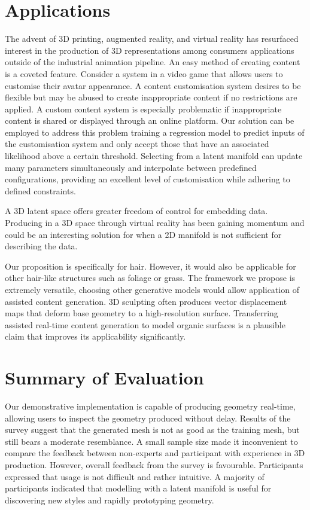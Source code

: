 \documentclass[ %
author={Dillon Keith Diep},
supervisor={Dr. Carl Henrik Ek},
degree={MEng},
title={ART-CG Hair:},
subtitle={Assisted Real-time Content Generation of Stylised Virtual Hair},
type={Research},
year={2017} ]{dissertation}
\begin{document}
\section{Applications}
\label{evaluation:application}
The advent of 3D printing, augmented reality, and virtual reality has resurfaced interest in the production of 3D representations among consumers applications outside of the industrial animation pipeline. An easy method of creating content is a coveted feature. Consider a system in a video game that allows users to customise their avatar appearance. A content customisation system desires to be flexible but may be abused to create inappropriate content if no restrictions are applied. A custom content system is especially problematic if inappropriate content is shared or displayed through an online platform. Our solution can be employed to address this problem training a regression model to predict inputs of the customisation system and only accept those that have an associated likelihood above a certain threshold. Selecting from a latent manifold can update many parameters simultaneously and interpolate between predefined configurations, providing an excellent level of customisation while adhering to defined constraints.

A 3D latent space offers greater freedom of control for embedding data. Producing in a 3D space through virtual reality has been gaining momentum and could be an interesting solution for when a 2D manifold is not sufficient for describing the data.

Our proposition is specifically for hair. However, it would also be applicable for other hair-like structures such as foliage or grass. The framework we propose is extremely versatile, choosing other generative models would allow application of assisted content generation. 3D sculpting often produces vector displacement maps that deform base geometry to a high-resolution surface. Transferring assisted real-time content generation to model organic surfaces is a plausible claim that improves its applicability significantly.

\section{Summary of Evaluation}
Our demonstrative implementation is capable of producing geometry real-time, allowing users to inspect the geometry produced without delay. Results of the survey suggest that the generated mesh is not as good as the training mesh, but still bears a moderate resemblance.
A small sample size made it inconvenient to compare the feedback between non-experts and participant with experience in 3D production. However, overall feedback from the survey is favourable. Participants expressed that usage is not difficult and rather intuitive. A majority of participants indicated that modelling with a latent manifold is useful for discovering new styles and rapidly prototyping geometry.
\end{document}
